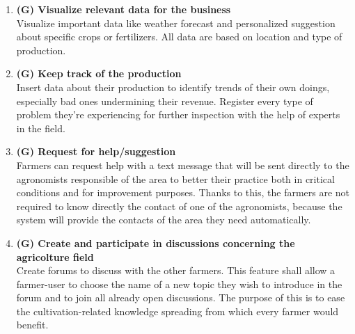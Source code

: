 \documentclass[table, 12pt]{article}
\begin{document}
\begin{enumerate}
    \item \textbf{(G) Visualize relevant data for the business}\\
    Visualize important data like weather forecast and personalized suggestion about specific crops or fertilizers.
    All data are based on location and type of production.
    \item \textbf{(G) Keep track of the production}\\
    Insert data about their production to identify trends of their own doings, especially bad ones undermining their revenue. Register every type of problem they're experiencing for further inspection with the help of experts in the field.
    \item \textbf{(G) Request for help/suggestion}\\
    Farmers can request help with a text message that will be sent directly to the agronomists responsible of the area to better their practice both in critical conditions and for improvement purposes. Thanks to this, the farmers are not required to know directly the contact of one of the agronomists, because the system will provide the contacts of the area they need automatically.
    \item \textbf{(G) Create and participate in discussions concerning the agricolture field}\\
    Create forums to discuss with the other farmers. This feature shall allow a farmer-user to choose the name of a new topic they wish to introduce in the forum and to join all already open discussions. The purpose of this is to ease the cultivation-related knowledge spreading from which every farmer would benefit.
\end{enumerate}
\end{document}
